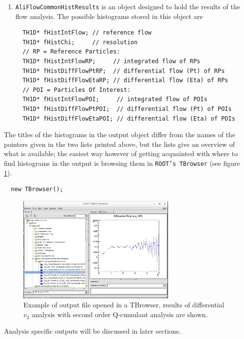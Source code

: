 \documentclass[a5paper]{book}
\numberwithin{equation}{subsection}
\begin{document}
\begin{enumerate}
\begin{lstlisting}
  TProfile* fRefMultVsNoOfRPs;    // <reference multiplicity> versus # of RPs
  TH1F*     fHistRefMult;         // reference multiplicity distribution
  TH2F*     fHistMassPOI;         // mass distribution for POI selection \end{lstlisting}
  This information is from the header file of the AliFlowCommonHist object\footnote{The headers of both output objects can be found in \texttt{\$ALICE\_ROOT/PWG/FLOW/Base/}.}
  \item \texttt{AliFlowCommonHistResults} is an object designed to hold the results of the flow analysis. The possible histograms stored in this object are
  \begin{lstlisting}
  TH1D* fHistIntFlow; // reference flow
  TH1D* fHistChi;     // resolution
  // RP = Reference Particles:  
  TH1D* fHistIntFlowRP;     // integrated flow of RPs
  TH1D* fHistDiffFlowPtRP;  // differential flow (Pt) of RPs
  TH1D* fHistDiffFlowEtaRP; // differential flow (Eta) of RPs
  // POI = Particles Of Interest:
  TH1D* fHistIntFlowPOI;     // integrated flow of POIs
  TH1D* fHistDiffFlowPtPOI;  // differential flow (Pt) of POIs
  TH1D* fHistDiffFlowEtaPOI; // differential flow (Eta) of POIs \end{lstlisting}
  
  \end{enumerate}
  The titles of the histograms in the output object differ from the names of the pointers given in the two lists printed above, but the lists give an overview of what is available; the easiest way however of getting acquainted with where to find histograms in the output is browsing them in \texttt{ROOT's TBrowser} (see figure \ref{fig:browserExample}).
  \begin{lstlisting}
  new TBrowser(); \end{lstlisting}
\begin{figure}
 \includegraphics[width=0.70\textwidth]{figs/browserExample.png}
 \caption[TBrowser with output file]{Example of output file opened in a TBrowser, results of differential $v_2$ analysis with second order Q-cumulant analysis are shown.}
 \label{fig:browserExample}
\end{figure}
Analysis specific outputs will be discussed in later sections. 
\end{document}
